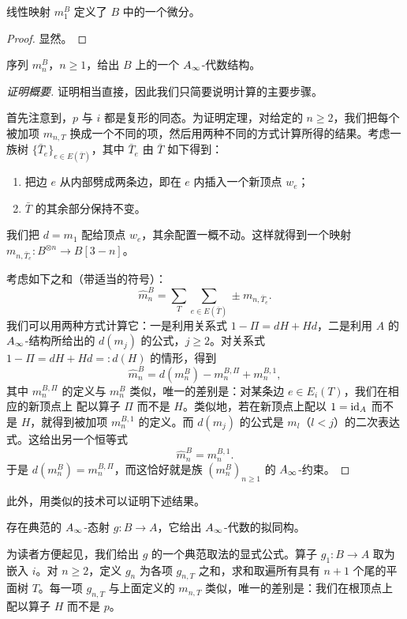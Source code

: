 \begin{prp}
线性映射 $m_1^B$ 定义了 $B$ 中的一个微分。
\end{prp}

\begin{proof}
显然。
\end{proof}

\begin{thm}
序列 $m_n^B$，$n\ge1$，给出 $B$ 上的一个 $A_{\infty}$-代数结构。
\end{thm}

\begin{proof}[证明概要]
证明相当直接，因此我们只简要说明计算的主要步骤。

首先注意到，$p$ 与 $i$ 都是复形的同态。为证明定理，对给定的 $n\ge2$，我们把每个被加项
$m_{n,T}$ 换成一个不同的项，然后用两种不同的方式计算所得的结果。考虑一族树
$\{\bar T_e\}_{e\in E(\bar T)}$，其中 $\bar T_e$ 由 $\bar T$ 如下得到：
\begin{enumerate}[label=\alph*),leftmargin=2.6em]
  \item 把边 $e$ 从内部劈成两条边，即在 $e$ 内插入一个新顶点 $w_e$；
  \item $\bar T$ 的其余部分保持不变。
\end{enumerate}
我们把 $d=m_1$ 配给顶点 $w_e$，其余配置一概不动。这样就得到一个映射
$m_{n,\bar T_e}:B^{\otimes n}\to B[3-n]$。

考虑如下之和（带适当的符号）：
\[
  \hat m_n^B=\sum_T\sum_{e\in E(\bar T)}\pm m_{n,\bar T_e}.
\]
我们可以用两种方式计算它：一是利用关系式 $1-\Pi=dH+Hd$，二是利用 $A$ 的 $A_{\infty}$-结构所给出的
$d(m_j)$ 的公式，$j\ge2$。对关系式 $1-\Pi=dH+Hd=:d(H)$ 的情形，得到
\[
  \hat m_n^B=d(m_n^B)-m_n^{B,\Pi}+m_n^{B,1},
\]
其中 $m_n^{B,\Pi}$ 的定义与 $m_n^B$ 类似，唯一的差别是：对某条边 $e\in E_i(T)$，我们在相应的新顶点上
配以算子 $\Pi$ 而不是 $H$。类似地，若在新顶点上配以 $1=\mathrm{id}_A$ 而不是 $H$，就得到被加项
$m_n^{B,1}$ 的定义。而 $d(m_j)$ 的公式是 $m_l$（$l<j$）的二次表达式。这给出另一个恒等式
\[
  \hat m_n^B=m_n^{B,1}.
\]
于是 $d(m_n^B)=m_n^{B,\Pi}$，而这恰好就是族 $(m_n^B)_{n\ge1}$ 的 $A_{\infty}$-约束。
\end{proof}

此外，用类似的技术可以证明下述结果。

\begin{prp}
存在典范的 $A_{\infty}$-态射 $g:B\to A$，它给出 $A_{\infty}$-代数的拟同构。
\end{prp}

为读者方便起见，我们给出 $g$ 的一个典范取法的显式公式。算子 $g_1:B\to A$ 取为嵌入 $i$。对
$n\ge2$，定义 $g_n$ 为各项 $g_{n,T}$ 之和，求和取遍所有具有 $n+1$ 个尾的平面树 $T$。每一项
$g_{n,T}$ 与上面定义的 $m_{n,T}$ 类似，唯一的差别是：我们在根顶点上配以算子 $H$ 而不是 $p$。

